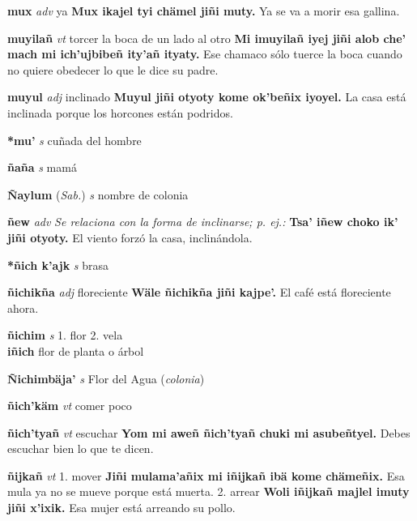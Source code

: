 \documentclass[10pt]{scrbook}
\newcommand{\entry}[1]{\textbf{#1}}
\newcommand{\alphaletter}[1]{\end{multicols}\addsec{#1}\begin{multicols}{2}}
\newcommand{\onedefinition}[1]{#1.}
\newcommand{\nontranslationdef}[1]{\textit{#1}}
\newcommand{\partofspeech}[1]{\textit{#1}}
\newcommand{\spanishtranslation}[1]{#1}
\newcommand{\clarification}[1]{(\textit{#1})}
\newcommand{\cholexample}[1]{\textbf{#1}}
\newcommand{\exampletranslation}[1]{#1}
\newcommand{\relevantdialect}[1]{(\textit{#1})}
\newcommand{\secondaryentry}[1]{\\\textbf{#1}}
\newcommand{\secondtranslation}[1]{#1}
\begin{document}
\begin{multicols}{2}
\entry{mux}
\partofspeech{adv}
\spanishtranslation{ya}
\cholexample{Mux ikajel tyi chämel jiñi muty.}
\exampletranslation{Ya se va a morir esa gallina.}

\entry{muyilañ}
\partofspeech{vt}
\spanishtranslation{torcer la boca de un lado al otro}
\cholexample{Mi imuyilañ iyej jiñi alob che' mach mi ich'ujbibeñ ity'añ ityaty.}
\exampletranslation{Ese chamaco sólo tuerce la boca cuando no quiere obedecer lo que le dice su padre.}

\entry{muyul}
\partofspeech{adj}
\spanishtranslation{inclinado}
\cholexample{Muyul jiñi otyoty kome ok'beñix iyoyel.}
\exampletranslation{La casa está inclinada porque los horcones están podridos.}

\entry{*mu'}
\partofspeech{s}
\spanishtranslation{cuñada del hombre}

\alphaletter{Ñ}

\entry{ñaña}
\partofspeech{s}
\spanishtranslation{mamá}

\entry{Ñaylum}
\relevantdialect{Sab.}
\partofspeech{s}
\spanishtranslation{nombre de colonia}

\entry{ñew}
\partofspeech{adv}
\nontranslationdef{Se relaciona con la forma de inclinarse; p. ej.:}
\cholexample{Tsa' iñew choko ik' jiñi otyoty.}
\exampletranslation{El viento forzó la casa, inclinándola.}

\entry{*ñich k'ajk}
\partofspeech{s}
\spanishtranslation{brasa}

\entry{ñichikña}
\partofspeech{adj}
\spanishtranslation{floreciente}
\cholexample{Wäle ñichikña jiñi kajpe'.}
\exampletranslation{El café está floreciente ahora.}

\entry{ñichim}
\partofspeech{s}
\onedefinition{1}
\spanishtranslation{flor}
\onedefinition{2}
\spanishtranslation{vela}
\secondaryentry{iñich}
\secondtranslation{flor de planta o árbol}

\entry{Ñichimbäja'}
\partofspeech{s}
\spanishtranslation{Flor del Agua}
\clarification{colonia}

\entry{ñich'käm}
\partofspeech{vt}
\spanishtranslation{comer poco}

\entry{ñich'tyañ}
\partofspeech{vt}
\spanishtranslation{escuchar}
\cholexample{Yom mi aweñ ñich'tyañ chuki mi asubeñtyel.}
\exampletranslation{Debes escuchar bien lo que te dicen.}

\entry{ñijkañ}
\partofspeech{vt}
\onedefinition{1}
\spanishtranslation{mover}
\cholexample{Jiñi mulama'añix mi iñijkañ ibä kome chämeñix.}
\exampletranslation{Esa mula ya no se mueve porque está muerta.}
\onedefinition{2}
\spanishtranslation{arrear}
\cholexample{Woli iñijkañ majlel imuty jiñi x'ixik.}
\exampletranslation{Esa mujer está arreando su pollo.}


\end{multicols}
\end{document}
